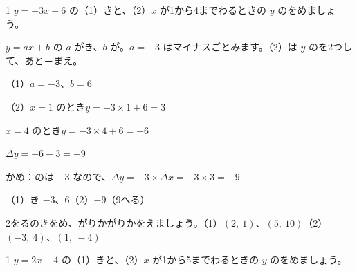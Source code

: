 \begin{reidai}
1 $y=-3x+6$ の（1）\nobreak {}きと、（2）\nobreak $x$ が1から4までわるときの $y$ のをめましょう。\par
\kangaekata $y=ax+b$ の $a$ がき、$b$ が。$a=-3$ はマイナスごとみます。（2）は $y$ のを2つして、あと－まえ。\par
\shiki（1）\nobreak $a=-3$、$b=6$\par
\hspace*{2.6\zw}（2）\nobreak $x=1$ のとき\quad $y=-3\times1+6=3$\par
\hspace*{2.6\zw}\phantom{（2）}$x=4$ のとき\quad $y=-3\times4+6=-6$\par
\hspace*{2.6\zw}\phantom{（2）}$\Delta y=-6-3=-9$\par
\hspace*{2.6\zw}かめ：のは $-3$ なので、$\Delta y=-3\times\Delta x=-3\times3=-9$\par
\kotae（1）\nobreak {}き $-3$、6\quad（2）\nobreak $-9$（9へる）
\end{reidai}

\begingroup{}%
\noindent\begin{minipage}[t]{0.49\linewidth}
\begin{jibun}\raggedright
2をるのきをめ、がりかがりかをえましょう。（1）\nobreak $(2,\ 1)$、$(5,\ 10)$\quad（2）\nobreak $(-3,\ 4)$、$(1,\ -4)$
\end{jibun}
\end{minipage}\hfill
\begin{minipage}[t]{0.49\linewidth}
\begin{jibun}\raggedright
1 $y=2x-4$ の（1）\nobreak {}きと、（2）\nobreak $x$ が1から5までわるときの $y$ のをめましょう。
\end{jibun}
\end{minipage}\par
\endgroup

